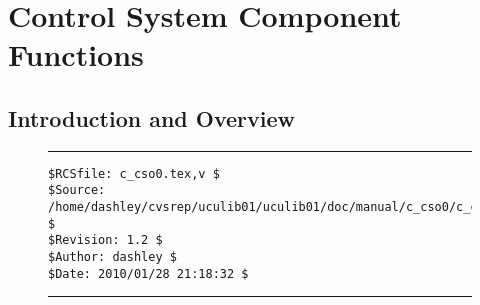 
\chapter{Control System Component Functions}

\label{ccso0}

\section{Introduction and Overview}
\label{ccso0:siov0}


\noindent\begin{figure}[!b]
\noindent\rule[-0.25in]{\textwidth}{1pt}
\begin{tiny}
\begin{verbatim}
$RCSfile: c_cso0.tex,v $
$Source: /home/dashley/cvsrep/uculib01/uculib01/doc/manual/c_cso0/c_cso0.tex,v $
$Revision: 1.2 $
$Author: dashley $
$Date: 2010/01/28 21:18:32 $
\end{verbatim}
\end{tiny}
\noindent\rule[0.25in]{\textwidth}{1pt}
\end{figure}

%
%

